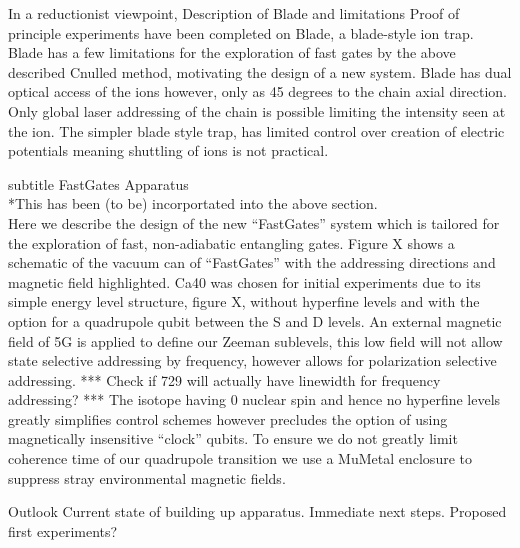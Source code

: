 \documentclass{article}
\begin{document}
In a reductionist viewpoint, 
Description of Blade and limitations Proof of principle experiments
have been completed on Blade, a blade-style ion trap. Blade has a few
limitations for the exploration of fast gates by the above described
Cnulled method, motivating the design of a new system.  Blade has dual
optical access of the ions however, only as 45 degrees to the chain
axial direction. Only global laser addressing of the chain is possible
limiting the intensity seen at the ion. The simpler blade style trap,
has limited control over creation of electric potentials meaning
shuttling of ions is not practical.


subtitle FastGates Apparatus\\
*This has been (to be) incorportated into the above section. \\

Here we describe the design of the new ``FastGates'' system which is
tailored for the exploration of fast, non-adiabatic entangling
gates. Figure X shows a schematic of the vacuum can of ``FastGates''
with the addressing directions and magnetic field highlighted. Ca40
was chosen for initial experiments due to its simple energy level
structure, figure X, without hyperfine levels and with the option for
a quadrupole qubit between the S and D levels. An external magnetic
field of 5G is applied to define our Zeeman sublevels, this low field
will not allow state selective addressing by frequency, however allows
for polarization selective addressing. *** Check if 729 will actually
have linewidth for frequency addressing? *** The isotope having 0
nuclear spin and hence no hyperfine levels greatly simplifies control
schemes however precludes the option of using magnetically insensitive
``clock'' qubits. To ensure we do not greatly limit coherence time of
our quadrupole transition we use a MuMetal enclosure to suppress stray
environmental magnetic fields.



Outlook
    Current state of building up apparatus.
    Immediate next steps.
    Proposed first experiments?

  
\end{document}
